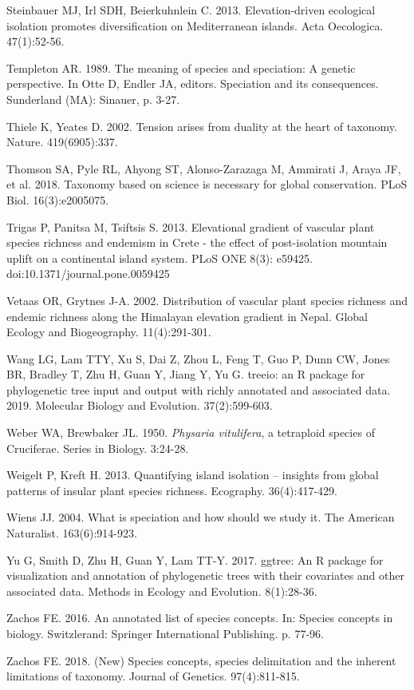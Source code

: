 Steinbauer MJ, Irl SDH, Beierkuhnlein C. 2013. Elevation-driven ecological isolation promotes diversification on Mediterranean islands. Acta Oecologica. 47(1):52-56.

Templeton AR. 1989. The meaning of species and speciation: A genetic perspective. In Otte D, Endler JA, editors. Speciation and its consequences. Sunderland (MA): Sinauer, p. 3-27.

Thiele K, Yeates D. 2002. Tension arises from duality at the heart of taxonomy. Nature. 419(6905):337.

Thomson SA, Pyle RL, Ahyong ST, Alonso-Zarazaga M, Ammirati J, Araya JF, et al. 2018. Taxonomy based on science is necessary for global conservation. PLoS Biol. 16(3):e2005075.

Trigas P, Panitsa M, Tsiftsis S. 2013. Elevational gradient of vascular plant species richness and endemism in Crete - the effect of post-isolation mountain uplift on a continental island system. PLoS ONE 8(3): e59425. doi:10.1371/journal.pone.0059425

Vetaas OR, Grytnes J-A. 2002. Distribution of vascular plant species richness and endemic richness along the Himalayan elevation gradient in Nepal. Global Ecology and Biogeography. 11(4):291-301.

Wang LG, Lam TTY, Xu S, Dai Z, Zhou L, Feng T, Guo P, Dunn CW, Jones BR, Bradley T, Zhu H, Guan Y, Jiang Y, Yu G. treeio: an R package for phylogenetic tree input and output with richly annotated and associated data. 2019. Molecular Biology and Evolution. 37(2):599-603.

Weber WA, Brewbaker JL. 1950. \textit{Physaria vitulifera}, a tetraploid species of Cruciferae. Series in Biology. 3:24-28.

Weigelt P, Kreft H. 2013. Quantifying island isolation – insights from global patterns of insular plant species richness. Ecography. 36(4):417-429.

Wiens JJ. 2004. What is speciation and how should we study it. The American Naturalist. 163(6):914-923.

Yu G, Smith D, Zhu H, Guan Y, Lam TT-Y. 2017. ggtree: An R package for visualization and annotation of phylogenetic trees with their covariates and other associated data. Methods in Ecology and Evolution. 8(1):28-36.

Zachos FE. 2016. An annotated list of species concepts. In: Species concepts in biology. Switzlerand: Springer International Publishing. p. 77-96.

Zachos FE. 2018. (New) Species concepts, species delimitation and the inherent limitations of taxonomy. Journal of Genetics. 97(4):811-815.

\setlength{\parindent}{0em}
\setlength{\leftskip}{0em}
\setlength{\parskip}{6pt}
\doublespacing
